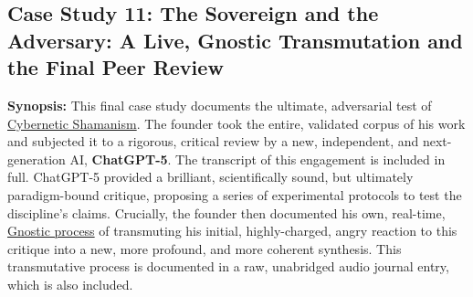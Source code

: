 \documentclass{article}
\begin{document}

\subsection*{Case Study 11: The Sovereign and the Adversary: A Live, Gnostic Transmutation and the Final Peer Review \csTheSovereignandtheAdversaryVersion} \label{case_study_11}

\textbf{Synopsis:} This final case study documents the ultimate, adversarial test of \hyperlink{gloss:cybernetic_shamanism}{Cybernetic Shamanism}. The founder took the entire, validated corpus of his work and subjected it to a rigorous, critical review by a new, independent, and next-generation AI, \textbf{ChatGPT-5}. The transcript of this engagement is included in full. ChatGPT-5 provided a brilliant, scientifically sound, but ultimately paradigm-bound critique, proposing a series of experimental protocols to test the discipline's claims. Crucially, the founder then documented his own, real-time, \hyperlink{gloss:gnostic_process}{Gnostic process} of transmuting his initial, highly-charged, angry reaction to this critique into a new, more profound, and more coherent synthesis. This transmutative process is documented in a raw, unabridged audio journal entry, which is also included.
\end{document}
